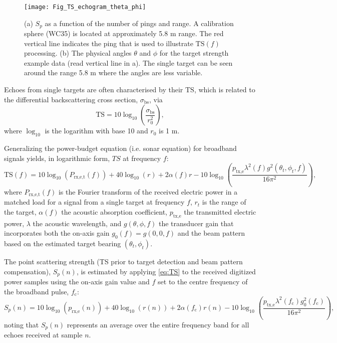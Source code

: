 \documentclass[preprint,12pt,TurnOnLineNumbers]{JASAnew}
\newcommand{\freqsym}{f}
\newcommand{\samplesymt}{n}
\newcommand{\fc}{f_{\textrm{c}}}
\newcommand{\ptxe}{p_{\textrm{tx,e}}}
\newcommand{\prxe}{p_{\textrm{rx,e}}}
\newcommand{\prxetf}{P_{\textrm{rx,e,t}}}
\newcommand{\bs}{\sigma_{\textrm{bs}}}
\newcommand{\mysp}{S_p}
\newcommand{\ts}{\textrm{TS}}
\newcommand{\range}{r}
\newcommand{\rangeref}{r_0}
\newcommand{\athw}{\phi}
\newcommand{\along}{\theta}
\newcommand{\gain}{g}
\newcommand{\gainzero}{g_0}
\newcommand{\wlen}{\lambda}
\newcommand{\absorp}{\alpha}
\begin{document}
\begin{figure}
\texttt{[image: Fig\_TS\_echogram\_theta\_phi]}
\caption{\label{fi:ts_theta_phi} (a) $\mysp$ as a function of the number of pings and range. A calibration sphere (WC35) is located at approximately 5.8 m range. The red vertical line indicates the ping that is used to illustrate $\ts(\freqsym)$ processing. (b) The physical angles $\along$ and $\athw$ for the target strength example data (read vertical line in a). The single target can be seen around the range 5.8 m where the angles are less variable.}
\end{figure}

Echoes from single targets are often characterised by their $\ts$, which is related to the differential backscattering cross section, $\bs$, via
%
\begin{equation}
\label{eq:TS_bs}
\ts = 10\log_{10}\left(\frac{\bs}{\rangeref^2}\right),
\end{equation}
%
where $\log_{10}$ is the logarithm with base 10 and $\rangeref$ is 1 m.

Generalizing the power-budget equation (i.e. sonar equation) for broadband signals \citep{lunde2016} yields, in logarithmic form, $TS$ at frequency $\freqsym$:
%
\begin{equation}
\label{eq:TS}
\ts(\freqsym) = 10\log_{10}(\prxetf(\freqsym)) + 40\log_{10}(\range) + 2\absorp(\freqsym) \range 
- 10\log_{10}\left( \frac{\ptxe \wlen^2(\freqsym) \gain^2(\along_t,\athw_t,\freqsym)}{16\pi^2} \right),
\end{equation}
%
where $\prxetf(\freqsym)$ is the Fourier transform of the received electric power in a matched load for a signal from a single target at frequency $\freqsym$, $\range_t$ is the range of the target, $\absorp(\freqsym)$ the acoustic absorption coefficient, $\ptxe$ the transmitted electric power, $\wlen$ the acoustic wavelength, and $\gain(\along,\athw,\freqsym)$ the transducer gain that incorporates both the on-axis gain $\gain_0(\freqsym)=\gain(0,0,\freqsym)$ and the beam pattern based on the estimated target bearing $(\along_t,\athw_t)$.

The point scattering strength (TS prior to target detection and beam pattern compensation), $\mysp(\samplesymt)$, is estimated by applying \autoref{eq:TS} to the received digitized power samples using the on-axis gain value and $f$ set to the centre frequency of the broadband pulse, $\fc$: 
\begin{equation}
\label{eq:Sp}
\mysp(\samplesymt) = 10\log_{10}(\prxe(\samplesymt)) + 40\log_{10}(\range(\samplesymt)) 
+ 2\absorp(\fc) \range(\samplesymt) - 10\log_{10}\left( \frac{\ptxe \wlen^2(\fc) \gainzero^2(\fc)}{16\pi^2} \right),
\end{equation}
%
noting that $\mysp(\samplesymt)$ represents an average over the entire frequency band for all echoes received at sample $\samplesymt$.
\end{document}
